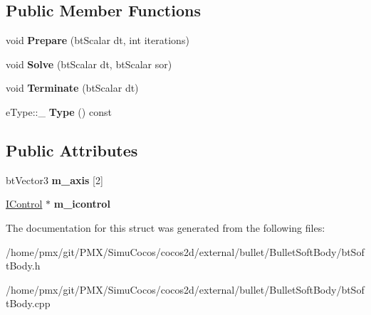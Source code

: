 \subsection*{Public Member Functions}
\begin{DoxyCompactItemize}
\item 
\mbox{\label{structbtSoftBody_1_1AJoint_a43fe2375c81f89ba8a0090f4561bed43}} 
void {\bfseries Prepare} (bt\+Scalar dt, int iterations)
\item 
\mbox{\label{structbtSoftBody_1_1AJoint_a9c0981fa66ca3998f6a9ed3c221b496b}} 
void {\bfseries Solve} (bt\+Scalar dt, bt\+Scalar sor)
\item 
\mbox{\label{structbtSoftBody_1_1AJoint_adc2443dc9477a4c90c1597c3dc86e04a}} 
void {\bfseries Terminate} (bt\+Scalar dt)
\item 
\mbox{\label{structbtSoftBody_1_1AJoint_af861fe8cd1fbd931783889d8aded56c2}} 
e\+Type\+::\+\_\+ {\bfseries Type} () const
\end{DoxyCompactItemize}
\subsection*{Public Attributes}
\begin{DoxyCompactItemize}
\item 
\mbox{\label{structbtSoftBody_1_1AJoint_a045c37b97d087308684d248b7d1ca51e}} 
bt\+Vector3 {\bfseries m\+\_\+axis} \mbox{[}2\mbox{]}
\item 
\mbox{\label{structbtSoftBody_1_1AJoint_a9caf65d5ea6cfa0a85a31b8f96865526}} 
\hyperlink{structbtSoftBody_1_1AJoint_1_1IControl}{I\+Control} $\ast$ {\bfseries m\+\_\+icontrol}
\end{DoxyCompactItemize}


The documentation for this struct was generated from the following files\+:\begin{DoxyCompactItemize}
\item 
/home/pmx/git/\+P\+M\+X/\+Simu\+Cocos/cocos2d/external/bullet/\+Bullet\+Soft\+Body/bt\+Soft\+Body.\+h\item 
/home/pmx/git/\+P\+M\+X/\+Simu\+Cocos/cocos2d/external/bullet/\+Bullet\+Soft\+Body/bt\+Soft\+Body.\+cpp\end{DoxyCompactItemize}

